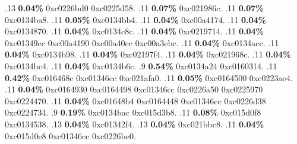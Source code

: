 \begin{profile}
{.13 \textbf{0.04\%} 0xc0226bd0\newline {} 0xc0225d58. 
.11 \textbf{0.07\%} 0xc021986c. 
.11 \textbf{0.07\%} 0xc0134ba8. 
.11 \textbf{0.05\%} 0xc0134bb4. 
.11 \textbf{0.04\%} 0xc00a4174. 
.11 \textbf{0.04\%} 0xc0134870. 
.11 \textbf{0.04\%} 0xc0134c8c. 
.11 \textbf{0.04\%} 0xc0219714. 
.11 \textbf{0.04\%} 0xc01349cc\newline {} 0xc00a4190\newline {} 0xc00a40cc\newline {} 0xc00a3ebc. 
.11 \textbf{0.04\%} 0xc0134acc. 
.11 \textbf{0.04\%} 0xc0134b98. 
.11 \textbf{0.04\%} 0xc02197f4. 
.11 \textbf{0.04\%} 0xc021968c. 
.11 \textbf{0.04\%} 0xc0134bc4. 
.11 \textbf{0.04\%} 0xc0134b6c. 
.9 \textbf{0.54\%} 0xc0134a24\newline {} 0xc0160314. 
.11 \textbf{0.42\%} 0xc016468c\newline {} 0xc01346cc\newline {} 0xc021afa0. 
.11 \textbf{0.05\%} 0xc0164500\newline {} 0xc0223ae4. 
.11 \textbf{0.04\%} 0xc0164930\newline {} 0xc0164498\newline {} 0xc01346cc\newline {} 0xc0226a50\newline {} 0xc0225970\newline {} 0xc0224470. 
.11 \textbf{0.04\%} 0xc01648b4\newline {} 0xc0164448\newline {} 0xc01346cc\newline {} 0xc0226d38\newline {} 0xc0224734. 
.9 \textbf{0.19\%} 0xc0134bac\newline {} 0xc015d3b8. 
.11 \textbf{0.08\%} 0xc015d0f8\newline {} 0xc0134538. 
.13 \textbf{0.04\%} 0xc01342f4. 
.13 \textbf{0.04\%} 0xc021bbc8. 
.11 \textbf{0.04\%} 0xc015d0e8\newline {} 0xc01346cc\newline {} 0xc0226be0. 
}
\end{profile}
